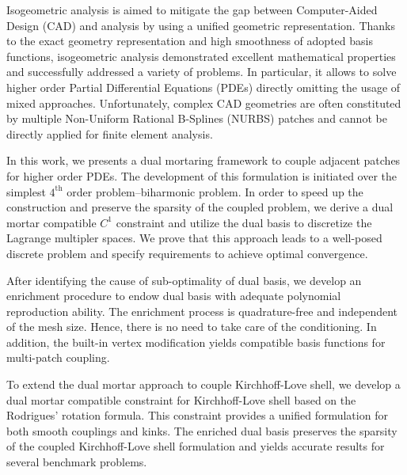\afterpage{\cleardoublepage}

Isogeometric analysis is aimed to mitigate the gap between Computer-Aided Design (CAD) and analysis by using a unified geometric representation. Thanks to the exact geometry representation and high smoothness of adopted basis functions, isogeometric analysis demonstrated excellent mathematical properties and successfully addressed a variety of problems. In particular, it allows to solve higher order Partial Differential Equations (PDEs) directly omitting the usage of mixed approaches. Unfortunately, complex CAD geometries are often constituted by multiple Non-Uniform Rational B-Splines (NURBS) patches and cannot be directly applied for finite element analysis.\par

In this work, we presents a dual mortaring framework to couple adjacent patches for higher order PDEs. The development of this formulation is initiated over the simplest $4^\text{th}$ order problem--biharmonic problem. In order to speed up the construction and preserve the sparsity of the coupled problem, we derive a dual mortar compatible $C^1$ constraint and utilize the \Bezier dual basis to discretize the Lagrange multipler spaces. We prove that this approach leads to a well-posed discrete problem and specify requirements to achieve optimal convergence. \par

After identifying the cause of sub-optimality of \Bezier dual basis, we develop an enrichment procedure to endow \Bezier dual basis with adequate polynomial reproduction ability. The enrichment process is quadrature-free and independent of the mesh size. Hence, there is no need to take care of the conditioning. In addition, the built-in vertex modification yields compatible basis functions for multi-patch coupling.\par

To extend the dual mortar approach to couple Kirchhoff-Love shell, we develop a dual mortar compatible constraint for Kirchhoff-Love shell based on the Rodrigues' rotation formula. This constraint provides a unified formulation for both smooth couplings and kinks. The enriched \Bezier dual basis preserves the sparsity of the coupled Kirchhoff-Love shell formulation and yields accurate results for several benchmark problems.\par

